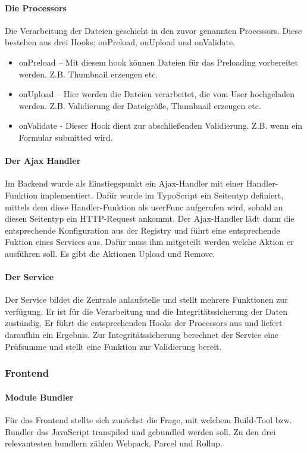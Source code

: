 \paragraph{Die Processors} Die Verarbeitung der Dateien geschieht in den zuvor genannten Processors. Diese bestehen aus drei Hooks: onPreload, onUpload und onValidate.

\begin{itemize}
	\item onPreload 	– Mit diesem hook können Dateien für das Preloading vorbereitet werden. Z.B. Thumbnail erzeugen etc.
	\item onUpload 		– Hier werden die Dateien verarbeitet, die vom User hochgeladen werden. Z.B. Validierung der Dateigröße, Thumbnail erzeugen etc.
	\item onValidate	- Dieser Hook dient zur abschließenden Validierung. Z.B. wenn ein Formular submitted wird.
\end{itemize}

\paragraph{Der Ajax Handler} Im Backend wurde als Einstiegspunkt ein Ajax-Handler mit einer Handler-Funktion implementiert. Dafür wurde im TypoScript ein Seitentyp definiert, mittels dem diese Handler-Funktion als userFunc aufgerufen wird, sobald an diesen Seitentyp ein HTTP-Request ankommt. Der Ajax-Handler lädt dann die entsprechende Konfiguration aus der Registry und führt eine entsprechende Fuktion eines Services aus. Dafür muss ihm mitgeteilt werden welche Aktion er ausführen soll. Es gibt die Aktionen Upload und Remove.

\paragraph{Der Service} Der Service bildet die Zentrale anlaufstelle und stellt mehrere Funktionen zur verfügung. Er ist für die Verarbeitung und die Integritätssicherung der Daten zuständig. Er führt die entsprechenden Hooks der Processors aus und liefert daraufhin ein Ergebnis. Zur Integritätssicherung berechnet der Service eine Prüfsumme und stellt eine Funktion zur Validierung bereit.


\subsubsection{Frontend}
\label{sec:Frontend}

\paragraph{Module Bundler} Für das Frontend stellte sich zunächst die Frage, mit welchem Build-Tool bzw. Bundler das JavaScript transpiled und gebundled werden soll. Zu den drei relevantesten bundlern zählen Webpack, Parcel und Rollup.

